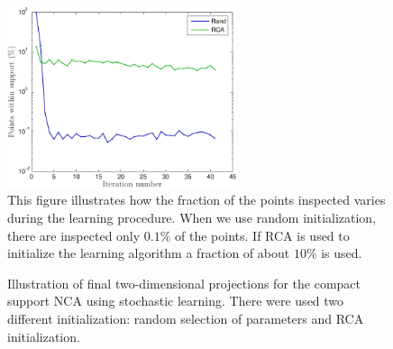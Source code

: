 \begin{figure}
	\centering
	\includegraphics[width=0.6\textwidth]{images/nca-cs-nnzs}
	\caption[Fraction of the points visited during the training of the compact support NCA ]{This figure illustrates how the fraction of the points inspected varies during the learning procedure. When we use random initialization, there are inspected only $0.1\%$ of the points. If RCA is used to initialize the learning algorithm a fraction of about $10\%$ is used.}
	\label{fig:nca-cs-nnzs}
\end{figure}
\begin{figure}
		 \centering
			    \hspace{0.02\textwidth}
		\caption[Two dimensional projections of the \texttt{landsat} data set using the stochastic learning for the compact support NCA]{Illustration of final two-dimensional projections for the compact support NCA using stochastic learning. There were used two different initialization: random selection of parameters and RCA initialization.}
		\label{fig:landsat-projection}
	\end{figure}

